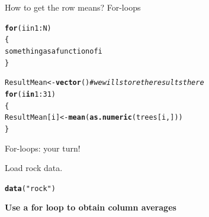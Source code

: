 \documentclass[10pt]{beamer}\usepackage[]{graphicx}\usepackage[]{color}
\makeatletter
\newcommand{\hlnum}[1]{\textcolor[rgb]{0.686,0.059,0.569}{#1}}%
\newcommand{\hlstr}[1]{\textcolor[rgb]{0.192,0.494,0.8}{#1}}%
\newcommand{\hlcom}[1]{\textcolor[rgb]{0.678,0.584,0.686}{\textit{#1}}}%
\newcommand{\hlopt}[1]{\textcolor[rgb]{0,0,0}{#1}}%
\newcommand{\hlstd}[1]{\textcolor[rgb]{0.345,0.345,0.345}{#1}}%
\newcommand{\hlkwa}[1]{\textcolor[rgb]{0.161,0.373,0.58}{\textbf{#1}}}%
\newcommand{\hlkwb}[1]{\textcolor[rgb]{0.69,0.353,0.396}{#1}}%
\newcommand{\hlkwd}[1]{\textcolor[rgb]{0.737,0.353,0.396}{\textbf{#1}}}%
\newenvironment{kframe}{%
 \def\at@end@of@kframe{}%
 \ifinner\ifhmode%
  \def\at@end@of@kframe{\end{minipage}}%
  \begin{minipage}{\columnwidth}%
 \fi\fi%
 \def\FrameCommand##1{\hskip\@totalleftmargin \hskip-\fboxsep
 \colorbox{shadecolor}{##1}\hskip-\fboxsep
     \hskip-\linewidth \hskip-\@totalleftmargin \hskip\columnwidth}%
 \MakeFramed {\advance\hsize-\width
   \@totalleftmargin\z@ \linewidth\hsize
   \@setminipage}}%
 {\par\unskip\endMakeFramed%
 \at@end@of@kframe}
\newenvironment{knitrout}{}{} %
\makeatother
\begin{document}
\begin{frame}[fragile]{How to get the row means? For-loops}

\begin{knitrout}
\color{fgcolor}\begin{kframe}
\begin{alltt}
  \hlkwd{for} (i in 1:N)
  \{
    something as a function of i
  \}
\end{alltt}
\end{kframe}
\end{knitrout}
  
  \pause
\begin{knitrout}
\color{fgcolor}\begin{kframe}
\begin{alltt}
\hlstd{ResultMean} \hlkwb{<-} \hlkwd{vector}\hlstd{()} \hlcom{# we will store the results there}
\hlkwa{for} \hlstd{(i} \hlkwa{in} \hlnum{1}\hlopt{:}\hlnum{31}\hlstd{)}
\hlstd{\{}
  \hlstd{ResultMean[i]} \hlkwb{<-} \hlkwd{mean}\hlstd{(}\hlkwd{as.numeric}\hlstd{(trees[i,]))}
\hlstd{\}}
\end{alltt}
\end{kframe}
\end{knitrout}
  
\end{frame}

\begin{frame}[fragile]{For-loops: your turn!}

Load rock data.
\begin{knitrout}
\color{fgcolor}\begin{kframe}
\begin{alltt}
  \hlkwd{data}\hlstd{(}\hlstr{"rock"}\hlstd{)}
\end{alltt}
\end{kframe}
\end{knitrout}
  
  \centering
\textbf{\large Use a for loop to obtain column averages}
  
\end{frame}
\end{document}
